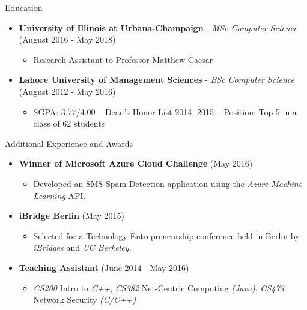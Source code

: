 \documentclass[]{Gohar_CV_Jobs}
\begin{document}
    \begin{cvsection}{Education}
        \begin{cvsubsection}{}{}{}
            \begin{itemize}
                \item \textbf{University of Illinois at Urbana-Champaign} - \textit{MSc Computer Science} (August 2016 - May 2018)
                    \begin{itemize}
                        \item Research Assistant to Professor Matthew Caesar 
                    \end{itemize}
                \item \textbf{Lahore University of Management Sciences} - \textit{BSc Computer Science} (August 2012 - May 2016)
                    \begin{itemize}
                        \item SGPA: 3.77/4.00 – Dean’s Honor List 2014, 2015 – Position: Top 5 in a class of 62 students
                    \end{itemize}
            \end{itemize}
        \end{cvsubsection}
    \end{cvsection}
    
    \begin{cvsection}{Additional Experience and Awards}
        \begin{cvsubsection}{}{}{}  
            \begin{itemize}
                \item \textbf{Winner of Microsoft Azure Cloud Challenge} (May 2016)
                    \begin{itemize}
                        \item Developed an SMS Spam Detection application using the \textit{Azure Machine Learning} API.
                    \end{itemize}
                \item \textbf{iBridge Berlin} (May 2015) 
                    \begin{itemize}
                        \item Selected for a Technology Entrepreneurship conference held in Berlin by \textit{iBridges} and \textit{UC Berkeley}.
                    \end{itemize}
                \item \textbf{Teaching Assistant} (June 2014 - May 2016) 
                    \begin{itemize}
                        \item \textit{CS200} Intro to \textit{C++}, \textit{CS382} Net-Centric Computing \textit{(Java)}, \textit{CS473} Network Security \textit{(C/C++)}
                    \end{itemize}
            \end{itemize}
        \end{cvsubsection}
    \end{cvsection}
\end{document}
